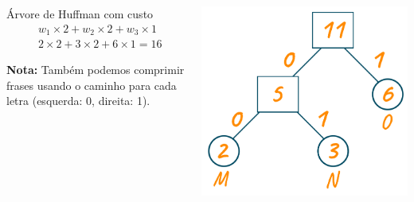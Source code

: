 \documentclass[12pt]{beamer}
\begin{document}
\begin{frame}

\begin{exemplo}
\begin{columns}
\begin{column}{0.6\textwidth}
Árvore de Huffman com custo 
\begin{align*}
    &w_1 \times 2 + w_2 \times 2 + w_3 \times 1\\
    &2 \times 2 + 3 \times 2 + 6 \times 1 = 16
\end{align*}

\textbf{Nota:} Também podemos comprimir frases usando o caminho para cada letra (esquerda: 0, direita: 1).
    
\end{column}

\begin{column}{0.31\textwidth}
\includegraphics[width=\textwidth]{img/huffman.png}    
\end{column}

\end{columns}
\end{exemplo}

\end{frame}
\end{document}

